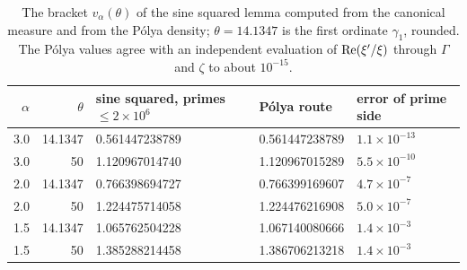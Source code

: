 \begin{table}[t]
\centering\small
\begin{tabular}{rrlll}
\toprule
$\alpha$ & $\theta$ & sine squared, primes $\le 2\times10^6$ & P\'olya route & error of prime side\\
\midrule
3.0 & 14.1347 & 0.561447238789 & 0.561447238789 & $1.1\times10^{-13}$\\
3.0 & 50 & 1.120967014740 & 1.120967015289 & $5.5\times10^{-10}$\\
2.0 & 14.1347 & 0.766398694727 & 0.766399169607 & $4.7\times10^{-7}$\\
2.0 & 50 & 1.224475714058 & 1.224476216908 & $5.0\times10^{-7}$\\
1.5 & 14.1347 & 1.065762504228 & 1.067140080666 & $1.4\times10^{-3}$\\
1.5 & 50 & 1.385288214458 & 1.386706213218 & $1.4\times10^{-3}$\\
\bottomrule
\end{tabular}
\caption{The bracket $v_\alpha(\theta)$ of the sine squared lemma computed from the canonical measure and from the P\'olya density; $\theta=14.1347$ is the first ordinate $\gamma_1$, rounded. The P\'olya values agree with an independent evaluation of $\operatorname{Re}(\xi'/\xi)$ through $\Gamma$ and $\zeta$ to about $10^{-15}$.}
\label{tab:prime}
\end{table}


